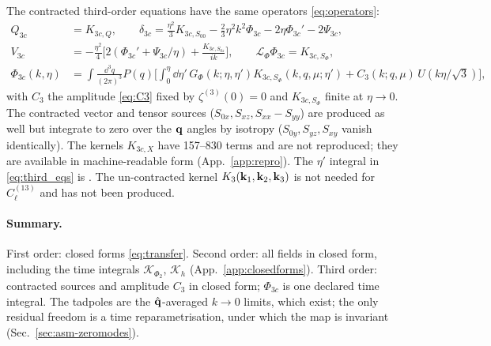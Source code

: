 The contracted third-order equations have the same operators \eqref{eq:operators}:
\begin{align}
Q_{3c}&=K_{3c,Q},\qquad
\delta_{3c}=\tfrac{\eta^2}3K_{3c,S_{00}}-\tfrac23\eta^2k^2\Phi_{3c}-2\eta\Phi_{3c}'-2\Psi_{3c},\nonumber\\
V_{3c}&=-\tfrac{\eta^2}4\Big[2(\Phi_{3c}'+\Psi_{3c}/\eta)+\frac{K_{3c,S_{0z}}}{ik}\Big],\qquad
\mathcal L_\Phi\Phi_{3c}=K_{3c,S_\Phi},\nonumber\\
\Phi_{3c}(k,\eta)&=\int\!\frac{\dd^3q}{(2\pi)^3}P(q)\Big[\int_0^\eta\!\dd\eta'\,G_\Phi(k;\eta,\eta')K_{3c,S_\Phi}(k,q,\mu;\eta')+C_3(k;q,\mu)\,U(k\eta/\sqrt3)\Big],
\label{eq:third_eqs}
\end{align}
with $C_3$ the amplitude \eqref{eq:C3} fixed by $\zeta^{(3)}(0)=0$ and $K_{3c,S_\Phi}$ finite at $\eta\to0$.
The contracted vector and tensor sources ($S_{0x},S_{xz},S_{xx}-S_{yy}$) are produced as well but integrate to
zero over the $\mathbf q$ angles by isotropy ($S_{0y},S_{yz},S_{xy}$ vanish identically).  The kernels
$K_{3c,X}$ have 157--830 terms and are not reproduced; they are available in machine-readable form (App.~\ref{app:repro}).
The $\eta'$ integral in \eqref{eq:third_eqs} is .
The un-contracted kernel $K_3(\mathbf k_1,\mathbf k_2,\mathbf k_3)$ is not needed for $C^{(13)}_\ell$ and has not been produced.

\paragraph{Summary.}
First order: closed forms \eqref{eq:transfer}.  Second order: all fields in closed form, including the time integrals
$\mathcal K_{\Phi_2}$, $\mathcal K_h$ (App.~\ref{app:closedforms}).  Third order: contracted sources and amplitude $C_3$ in closed form;
$\Phi_{3c}$ is one declared time integral.  The tadpoles are the $\hat{\mathbf q}$-averaged $k\to0$ limits, which exist; the only residual freedom is a time
reparametrisation, under which the map is invariant (Sec.~\ref{sec:asm-zeromodes}).
